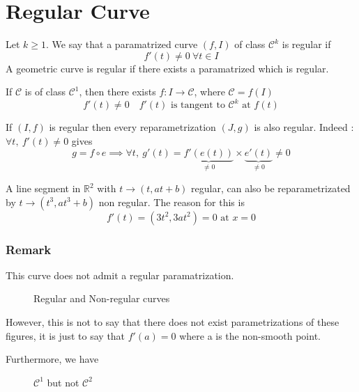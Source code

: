 \section{Regular Curve}
\label{sec:Regular Curve}

\begin{defn}
    Let $ k \geq 1 $. 
    We say that a paramatrized curve $ \left( f,I\right)  $ of class $ \mathscr{ C } ^k $
    is regular if 
    \[
        f'(t) \neq 0 \ \forall t \in I
    \]
    A geometric curve is regular if there exists a paramatrized which is regular. 
    \label{def:Regular Curve}
\end{defn}

If $ \mathscr{ C } $ is of class $ \mathscr{ C } ^1 $, then there exists $ f: I \to
\mathscr{ C }  $, where $ \mathscr{ C } = f\left( I\right)  $ 
\[
    f'(t) \neq 0 \quad f'(t) \text{ is tangent to } \mathscr{ C } ^k \text{ at } f(t)
\]

If $ \left( I,f\right)  $ is regular then every reparametrization $ \left( J,g \right)  $ 
is also regular. Indeed : $ \forall t, \ f'(t) \neq 0  $ gives 
\[
    g = f \circ e \implies \forall t,  \ g'(t) = \underbrace{f'(e(t))}_{\neq 0} \times 
    \underbrace{e'(t)}_{\neq 0}  \neq 0
\]

\begin{exmp}[]
    A line segment in $ \mathbb{R}^2 $ with $ t \to \left( t, at+b\right)  $ regular,
    can also be
    reparametrizated by $ t\to \left( t^3, at^3+b\right)  $ non regular. The reason for this is 
    \[
        f'(t) = \left( 3t^2, 3at^2\right) = 0 \text{ at } x = 0
    \]
\end{exmp}
\subsubsection{Remark}
This curve does not admit a regular paramatrization. 

    
\begin{figure}[ht]
    \centering
    \caption{Regular and Non-regular curves}
    \label{fig:regular-and-non-regular-curves}
\end{figure}

However, this is not to say that there does not exist parametrizations of these figures,
it is just to say that $ f'(a) = 0 $ where a is the non-smooth point. 

Furthermore, we have 


\begin{figure}[ht]
    \centering
    \caption{ $ \mathscr{ C } ^1 $ but not $ \mathscr{ C } ^2 $}
    \label{fig:c1-but-not-c2}
\end{figure}

